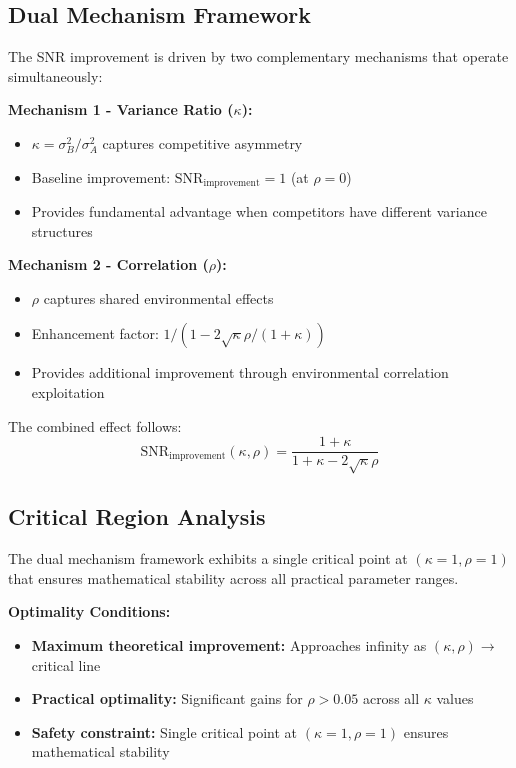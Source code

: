 \subsection{Dual Mechanism Framework}

The SNR improvement is driven by two complementary mechanisms that operate simultaneously:

\textbf{Mechanism 1 - Variance Ratio ($\kappa$):}
\begin{itemize}
    \item $\kappa = \sigma_B^2/\sigma_A^2$ captures competitive asymmetry
    \item Baseline improvement: $\text{SNR}_{\text{improvement}} = 1$ (at $\rho = 0$)
    \item Provides fundamental advantage when competitors have different variance structures
\end{itemize}

\textbf{Mechanism 2 - Correlation ($\rho$):}
\begin{itemize}
    \item $\rho$ captures shared environmental effects
    \item Enhancement factor: $1/(1 - 2\sqrt{\kappa}\rho/(1+\kappa))$
    \item Provides additional improvement through environmental correlation exploitation
\end{itemize}

The combined effect follows:
\begin{equation}
\text{SNR}_{\text{improvement}}(\kappa, \rho) = \frac{1 + \kappa}{1 + \kappa - 2\sqrt{\kappa}\rho} \label{eq:dual_mechanism}
\end{equation}

\subsection{Critical Region Analysis}

The dual mechanism framework exhibits a single critical point at $(\kappa=1, \rho=1)$ that ensures mathematical stability across all practical parameter ranges.

\textbf{Optimality Conditions:}
\begin{itemize}
    \item \textbf{Maximum theoretical improvement:} Approaches infinity as $(\kappa,\rho) \rightarrow$ critical line
    \item \textbf{Practical optimality:} Significant gains for $\rho > 0.05$ across all $\kappa$ values
    \item \textbf{Safety constraint:} Single critical point at $(\kappa=1, \rho=1)$ ensures mathematical stability
\end{itemize}

